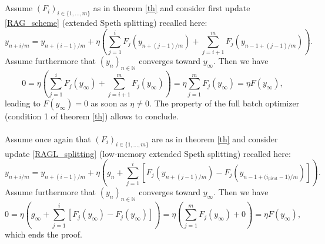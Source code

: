 \documentclass[article,authoryear,jmlmc]{beg_32}             %
\begin{document}
\section{}
\label{proof}

Assume $(F_i)_{i\in\{1,...,m\}}$ as in theorem \ref{th} and consider first update \eqref{RAG_scheme} (extended Speth splitting) recalled here: 
\begin{equation}
  y_{n+i/m} = y_{n+(i-1)/m}+\eta \left(\sum_{j=1}^i F_j\left(y_{n+(j-1)/m}\right)+\sum_{j=i+1}^m F_j\left(y_{n-1+(j-1)/m}\right)\right).
\end{equation}
Assume furthermore that $(y_n)_{n\in\mathbb{N}}$ converges toward $y_\infty$. 
Then we have 
\begin{equation}
  0= \eta \left(\sum_{j=1}^i F_j\left(y_{\infty}\right)+\sum_{j=i+1}^m F_j\left(y_{\infty}\right)\right) = \eta \sum_{j=1}^m F_j(y_\infty) = \eta F(y_\infty),
\end{equation}
leading to $F(y_\infty) = 0$ as soon as $\eta\neq 0$. 
The property of the full batch optimizer (condition 1 of theorem \ref{th}) allows to conclude. \\ \ \\

Assume once again that $(F_i)_{i\in\{1,...,m\}}$ are as in theorem \ref{th} and consider update \eqref{RAGL_splitting} (low-memory extended Speth splitting) recalled here: 
\begin{equation}
  y_{n+i/m} = y_{n+(i-1)/m}+\eta \left(g_n+\displaystyle{\sum_{j=1}^i} \left[F_j\left(y_{n+(j-1)/m}\right)-F_j\left(y_{{n-1+(i_{\text{pivot}}-1})/m}\right)\right]\right).
\end{equation}
Assume furthermore that $(y_n)_{n\in\mathbb{N}}$ converges toward $y_\infty$. 
Then we have 
\begin{equation}
  0= \eta \left(g_\infty+\displaystyle{\sum_{j=1}^i} \left[F_j\left(y_{\infty}\right)-F_j\left(y_{\infty}\right)\right] \right) = \eta \left(\sum_{j=1}^m F_j(y_\infty) +0\right)= \eta F(y_\infty),
\end{equation}
which ends the proof. 
\end{document}
